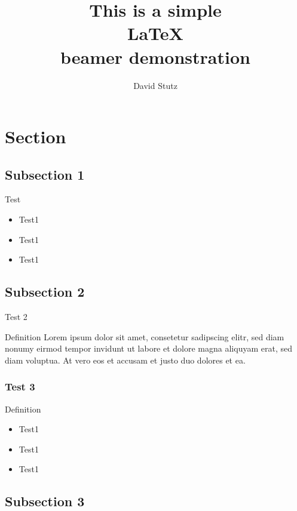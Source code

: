 \documentclass{beamer}
\title{This is a simple \\
\LaTeX{} \\
beamer demonstration}
\author{David Stutz}
\begin{document}
\GTtitle

\section{Section}

    \subsection{Subsection 1}

        \begin{frame}{Test}
            \begin{itemize}
                \item Test1
                \pause
                \item Test1
                \pause
                \item Test1
            \end{itemize}
        \end{frame}

    \subsection{Subsection 2}

        \begin{frame}{Test 2}
            \begin{block}{Definition}
                Lorem ipsum dolor sit amet, consetetur sadipscing elitr, sed diam nonumy eirmod tempor invidunt ut labore et dolore magna aliquyam erat, sed diam voluptua. At vero eos et accusam et justo duo dolores et ea.
            \end{block}
        \end{frame}

        \begin{frame}
            \frametitle{Test 3}
            \begin{block}{Definition}
            \begin{itemize}
                \item Test1
                \item Test1
                \item Test1
            \end{itemize}
            \end{block}
        \end{frame}

   \subsection{Subsection 3}
   
\end{document}

